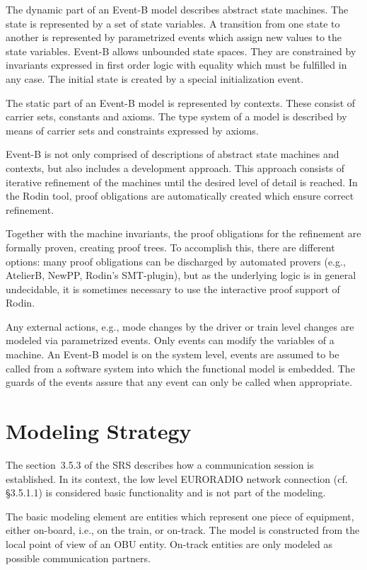 \documentclass[10pt,a4paper]{article}
\begin{document}
The dynamic part of an Event-B model describes abstract state machines. The
state is represented by a set of state variables. A transition from one state to
another is represented by parametrized events which assign new values to the
state variables. Event-B allows unbounded state spaces. They are constrained by
invariants expressed in first order logic with equality which must be fulfilled
in any case. The initial state is created by a special initialization event.

The static part of an Event-B model is represented by contexts. These consist of
carrier sets, constants and axioms. The type system of a model is described by
means of carrier sets and constraints expressed by axioms.

Event-B is not only comprised of descriptions of abstract state machines and
contexts, but also includes a development approach. This approach consists of
iterative refinement of the machines until the desired level of detail is
reached. In the Rodin tool, proof obligations are automatically created which
ensure correct refinement.

Together with the machine invariants, the proof obligations for the refinement
are formally proven, creating proof trees. To accomplish this, there are
different options: many proof obligations can be discharged by automated provers
(e.g., AtelierB, NewPP, Rodin's SMT-plugin), but as the underlying logic is in
general undecidable, it is sometimes necessary to use the interactive proof
support of Rodin.

Any external actions, e.g., mode changes by the driver or train level changes
are modeled via parametrized events. Only events can modify the variables of a
machine. An Event-B model is on the system level, events are assumed to be
called from a software system into which the functional model is embedded. The
guards of the events assure that any event can only be called when appropriate.

\section{Modeling Strategy}
\label{sec:modeling-strategy}

The section~3.5.3 of the SRS describes how a communication session is
established. In its context, the low level EURORADIO network connection
(cf. §3.5.1.1) is considered basic functionality and is not part of the
modeling.

The basic modeling element are entities which represent one piece of equipment,
either on-board, i.e., on the train, or on-track. The model is constructed from
the local point of view of an OBU entity. On-track entities are only modeled as
possible communication partners.
\end{document}
